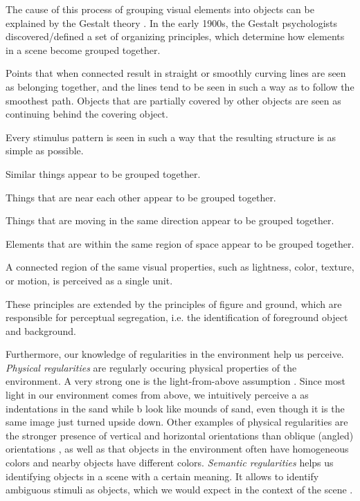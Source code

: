 The cause of this process of grouping visual elements into objects can be explained by the Gestalt theory \CN.
In the early 1900s, the Gestalt psychologists discovered/defined a set of organizing principles, which determine how elements in a scene become grouped together.
\begin{my_list_desc}
	\item[Good Continuation]
		Points that when connected result in straight or smoothly curving lines are seen as belonging together, and the lines tend to be seen in such a way as to follow the smoothest path.
		Objects that are partially covered by other objects are seen as continuing behind the covering object.
	
	\item[Pragnanz]
		Every stimulus pattern is seen in such a way that the resulting structure is as simple as possible.
	
	\item[Similarity]
		Similar things appear to be grouped together.
	
	\item[Proximity]
		Things that are near each other appear to be grouped together.
	
	\item[Commopn Fate]
		Things that are moving in the same direction appear to be grouped together.
	
	\item[Common Region]
		Elements that are within the same region of space appear to be grouped together.
	
	\item[Uniform Connectedness]
		A connected region of the same visual properties, such as lightness, color, texture, or motion, is perceived as a single unit.
\end{my_list_desc}
These principles are extended by the principles of figure and ground, which are responsible for perceptual segregation, i.e. the identification of foreground object and background.

Furthermore, our knowledge of regularities in the environment help us perceive.
\emph{Physical regularities} are regularly occuring physical properties of the environment. 
A very strong one is the light-from-above assumption \cite{Kleffner:1992:ShapeFromShading}.
Since most light in our environment comes from above, we intuitively perceive \II a as indentations in the sand while \II b look like mounds of sand, even though it is the same image just turned upside down.
Other examples of physical regularities are the stronger presence of vertical and horizontal orientations than oblique (angled) orientations \cite{Coppola:1998:UnequalRepresentations}, as well as that objects in the environment often have homogeneous colors and nearby objects have different colors.
\emph{Semantic regularities} helps us identifying objects in a scene with a certain meaning.
It allows to identify ambiguous stimuli as objects, which we would expect in the context of the scene \cite{Oliva:2007:RoleOfContext}.



